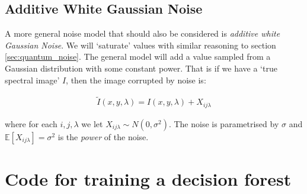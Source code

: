 \documentclass[12pt,twoside,notitlepage]{report}
\newcommand{\bb}[1]{\mathbb{#1}}
\begin{document}
    \section{Additive White Gaussian Noise}
        A more general noise model that should also be considered is \textit{additive white Gaussian Noise}. We will 
        `saturate' values with similar reasoning to section \ref{sec:quantum_noise}. The general model will add a 
        value sampled from a Gaussian distribution with some constant power. That is if we have a `true spectral image' 
        $I$, then the image corrupted by noise is:

        \begin{align}
            \tilde{I}(x,y,\lambda) = I(x,y,\lambda) + X_{ij\lambda}
        \end{align}

        where for each $i, j, \lambda$ we let $X_{ij\lambda} \sim N(0, \sigma^2)$. The noise is parametrised by 
        $\sigma$ and $\bb{E}[X_{ij\lambda}] = \sigma^2$ is the \textit{power} of the noise.









\cleardoublepage
\chapter{Code for training a decision forest} \label{app:train_tree}
    
\end{document}
